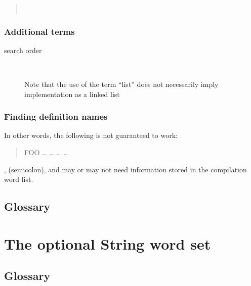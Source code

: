 \begin{quote}\ttfamily
	\word{:} \word{:}   
		~  ~
		  \word{:}
	\word{;}
\end{quote}

\setcounter{subsection}{1}
\subsubsection{Additional terms} %

\begin{description}
\item[search order] ~

	Note that the use of the term ``list'' does not necessarily
	imply implementation as a linked list
\end{description}

\setcounter{subsubsection}{2}
\subsubsection{Finding definition names} %

In other words, the following is not guaranteed to work:

\begin{quote}\ttfamily
	\word{:} FOO {\ldots}
		\word{[} {\ldots}  \word{]}
		{\ldots}  {\ldots} \\
	\word{;} 
\end{quote}
, \word{;} (semicolon), and  may
or may not need information stored in the compilation word list.

\setcounter{subsection}{5}
\subsection{Glossary} %


\section{The optional String word set} %
\label{rat:string}


\setcounter{subsection}{5}
\subsection{Glossary} %

